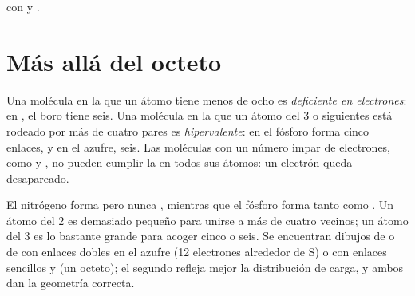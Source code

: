 \begin{omfigure}

{\small {} con  y .}
\end{omfigure}

\section{Más allá del octeto}

\begin{definition}\label{def:b1:lewis-resonance-vsepr:hypervalent}
Una molécula en la que un átomo tiene menos de ocho  es \emph{deficiente en electrones}: en , el
boro tiene seis. Una molécula en la que un átomo del  3 o
siguientes está rodeado por más de cuatro pares es
\emph{hipervalente}: en  el fósforo forma
cinco enlaces, y en  el azufre, seis. Las moléculas con un número
impar de electrones, como  y , no pueden cumplir la  en todos sus átomos: un electrón queda desapareado.
\end{definition}

\begin{remark}\label{rem:b1:lewis-resonance-vsepr:hypervalent}
El nitrógeno forma  pero nunca , mientras que el fósforo
forma tanto  como . Un átomo del  2 es demasiado
pequeño para unirse a más de cuatro vecinos; un átomo del  3 es lo
bastante grande para acoger cinco o seis. Se encuentran dibujos de
 o de  con enlaces dobles en el azufre (12
electrones alrededor de S) o con enlaces sencillos y  (un
octeto); el segundo refleja mejor la distribución de carga, y ambos dan
la geometría correcta.
\end{remark}

